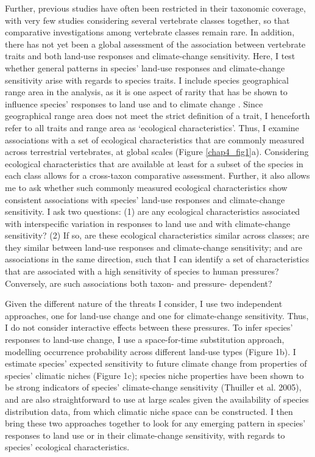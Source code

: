 Further, previous studies have often been restricted in their taxonomic coverage, with very few studies considering several vertebrate classes together, so that comparative investigations among vertebrate classes remain rare. In addition, there has not yet been a global assessment of the association between vertebrate traits and both land-use responses and climate-change sensitivity. Here, I test whether general patterns in species' land-use responses and climate-change sensitivity arise with regards to species traits. I include species geographical range area in the analysis, as it is one aspect of rarity that has be shown to influence species' responses to land use and to climate change \citep{Thuiller2005, Newbold2018}. Since geographical range area does not meet the strict definition of a trait, I henceforth refer to all traits and range area as `ecological characteristics'. Thus, I examine associations with a set of ecological characteristics that are commonly measured across terrestrial vertebrates, at global scales (Figure \ref{chap4_fig1}a). Considering ecological characteristics that are available at least for a subset of the species in each class allows for a cross-taxon comparative assessment. Further, it also allows me to ask whether such commonly measured ecological characteristics show consistent associations with species' land-use responses and climate-change sensitivity. I ask two questions: (1) are any ecological characteristics  associated with interspecific variation in responses  to land use and with climate-change sensitivity? (2) If so, are these ecological characteristics  similar across classes; are they similar between land-use responses and climate-change sensitivity; and are associations in the same direction, such that I can identify a set of characteristics that  are associated with a high sensitivity of species to human pressures? Conversely, are such associations both taxon- and pressure- dependent?

Given the different nature of the threats I consider, I use two independent approaches, one for land-use change and one for climate-change sensitivity. Thus, I do not consider interactive effects between these pressures. To infer species' responses to land-use change, I use a space-for-time substitution approach, modelling occurrence probability across different land-use types (Figure 1b). I estimate species' expected sensitivity to future climate change from properties of species' climatic niches (Figure 1c); species niche properties have been shown to be strong indicators of species' climate-change sensitivity (Thuiller et al. 2005), and are also straightforward to use at large scales given the availability of species distribution data, from which climatic niche space can be constructed. I then bring these two approaches together to look for any emerging pattern in species' responses to land use or in their climate-change  sensitivity, with regards to species' ecological characteristics.
 
